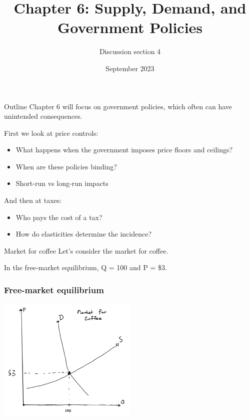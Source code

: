 \documentclass[aspectratio=169]{beamer}
\title{Chapter 6: Supply, Demand, and Government Policies}
\author{Discussion section 4}
\date{September 2023}
\begin{document}
\begin{frame}
    \titlepage 
\end{frame}

\begin{frame}{Outline}
    Chapter 6 will focus on government policies, which often can have unintended consequences. 

    First we look at price controls:
    
    \begin{itemize}
        \item What happens when the government imposes price floors and ceilings?
        \item When are these policies binding?
        \item Short-run vs long-run impacts
    \end{itemize}

    And then at taxes:

    \begin{itemize}
        \item Who pays the cost of a tax?
        \item How do elasticities determine the incidence?
    \end{itemize}
\end{frame}

\begin{frame}{Market for coffee}
    Let's consider the market for coffee.

    \vspace{5mm}

    In the free-market equilibrium, Q = 100 and P = \$3.
\end{frame}

\begin{frame}
    \frametitle{Free-market equilibrium}
    \centering
    \includegraphics[width = 0.5\textwidth,keepaspectratio]{coffee_eq.png}
\end{frame}
\end{document}
